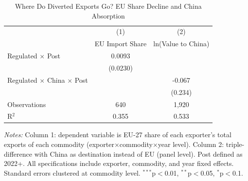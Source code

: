 \begin{table}[htbp]
\centering
\caption{Where Do Diverted Exports Go? EU Share Decline and China Absorption}
\label{tab:diversion}
\small
\begin{tabular}{lcc}
\hline\hline
 & (1) & (2) \\
 & EU Import Share & ln(Value to China) \\
\hline
Regulated $\times$ Post & 0.0093 & \\
 & (0.0230) & \\
Regulated $\times$ China $\times$ Post & & -0.067 \\
 & & (0.234) \\
\hline
Observations & 640 & 1,920 \\
R$^2$ & 0.355 & 0.533 \\
\hline\hline
\end{tabular}
\begin{minipage}{0.95\textwidth}
\vspace{0.3em}\footnotesize
\textit{Notes:} Column 1: dependent variable is EU-27 share of each exporter's total exports of each commodity (exporter$\times$commodity$\times$year level). Column 2: triple-difference with China as destination instead of EU (panel level). Post defined as 2022+. All specifications include exporter, commodity, and year fixed effects. Standard errors clustered at commodity level. $^{***}$p$<$0.01, $^{**}$p$<$0.05, $^{*}$p$<$0.1.
\end{minipage}
\end{table}
